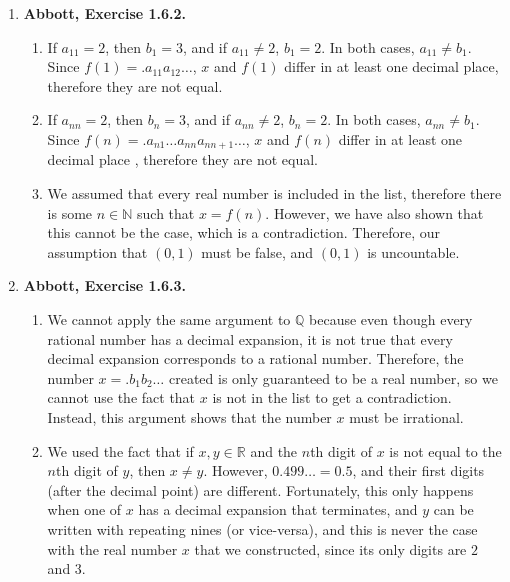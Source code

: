 \documentclass{article}
\newcommand{\N}{\mathbb{N}}
\newcommand{\Q}{\mathbb{Q}}
\newcommand{\R}{\mathbb{R}}
\newcommand{\exc}[2][Abbott]{\item \textbf{#1, Exercise #2.}}
\begin{document}
\begin{enumerate}
	\exc{1.6.2}
	\begin{enumerate}
		\item If $a_{11} = 2$, then $b_1 = 3$, and if $a_{11} \neq 2$, $b_1 = 2$. In both cases, $a_{11} \neq b_1$. Since $f(1) = .a_{11} a_{12} \dots$, $x$ and $f(1)$ differ in at least one decimal place, therefore they are not equal.
		      		      		      	      	      	      	              
		\item If $a_{nn} = 2$, then $b_n = 3$, and if $a_{nn} \neq 2$, $b_n = 2$. In both cases, $a_{nn} \neq b_1$. Since $f(n) = .a_{n 1} \dots a_{nn} a_{n n+1} \dots$, $x$ and $f(n)$ differ in at least one decimal place , therefore they are not equal.
		      		      		      	      	      	      	              
		\item We assumed that every real number is included in the list, therefore there is some $n \in \N$ such that $x = f(n)$. However, we have also shown that this cannot be the case, which is a contradiction. Therefore, our assumption that $(0, 1)$ must be false, and $(0, 1)$ is uncountable.
	\end{enumerate}
				      	          
	\exc{1.6.3}
				      	          
	\begin{enumerate}
		\item We cannot apply the same argument to $\Q$ because even though every rational number has a decimal expansion, it is not true that every decimal expansion corresponds to a rational number. Therefore, the number $x = .b_1b_2 \dots$ created is only guaranteed to be a real number, so we cannot use the fact that $x$ is not in the list to get a contradiction. Instead, this argument shows that the number $x$ must be irrational.
		      		      		      	      	      	      	              
		\item We used the fact that if $x, y \in \R$ and the $n$th digit of $x$ is not equal to the $n$th digit of $y$, then $x \neq y$. However, $0.499\dots = 0.5$, and their first digits (after the decimal point) are different. Fortunately, this only happens when one of $x$ has a decimal expansion that terminates, and $y$ can be written with repeating nines (or vice-versa), and this is never the case with the real number $x$ that we constructed, since its only digits are $2$ and $3$. 
	\end{enumerate}
				      	          

\end{enumerate}
\end{document}
